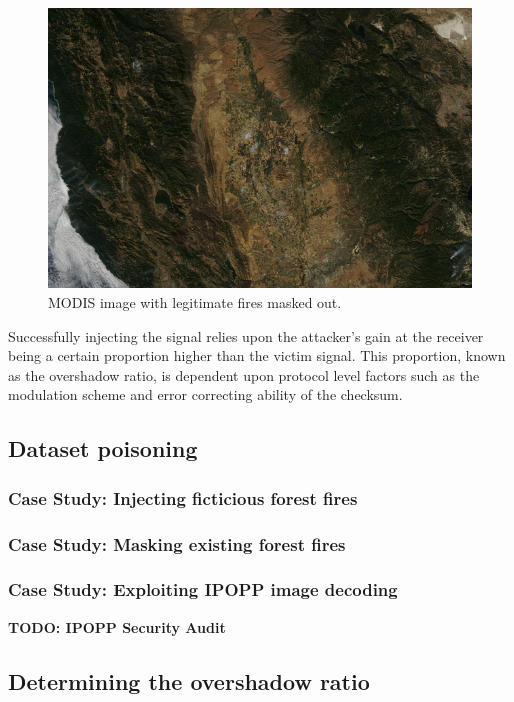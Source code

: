 \begin{figure}
    \includegraphics[width=\columnwidth]{diagrams/injection/masked_0.jpg}
    \caption{MODIS image with legitimate fires masked out.}
    \label{fig:injection-masked}
\end{figure}

Successfully injecting the signal relies upon the attacker's gain at the receiver being a certain proportion higher than the victim signal.
This proportion, known as the overshadow ratio, is dependent upon protocol level factors such as the modulation scheme and error correcting ability of the checksum.

\subsection{Dataset poisoning}

\subsubsection{Case Study: Injecting ficticious forest fires}

\subsubsection{Case Study: Masking existing forest fires}

\subsubsection{Case Study: Exploiting IPOPP image decoding}
\textbf{TODO: IPOPP Security Audit}

\subsection{Determining the overshadow ratio}
